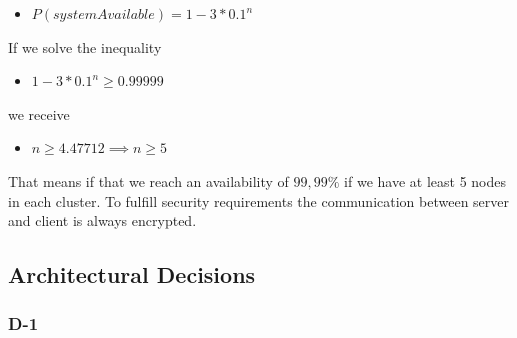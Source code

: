 \documentclass[11pt]{article}
\begin{document}
\begin{itemize}
\item $P(systemAvailable) = 1 - 3 *0.1^n$
\end{itemize}

If we solve the inequality

\begin{itemize}
\item $1 - 3 *0.1^n \ge 0.99999$
\end{itemize}

we receive

\begin{itemize}
\item $n \ge 4.47712 \implies n \ge 5$
\end{itemize}

That means if that we reach an availability of $99,99\%$ if we have at least 5 nodes in each cluster. To fulfill security requirements the communication between server and client is always encrypted.

\newpage

\subsection{Architectural Decisions}

\subsubsection{D-1}
\end{document}

